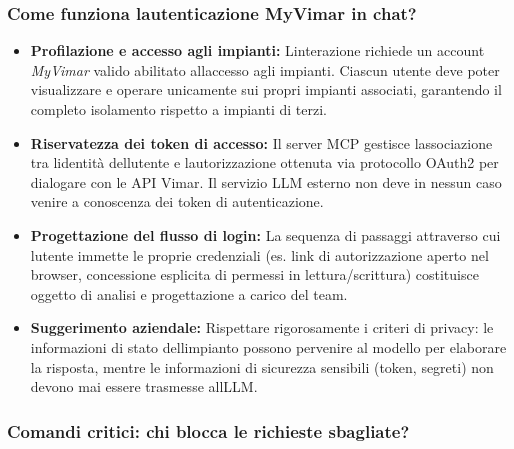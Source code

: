 \documentclass[12pt,a4paper]{article}
\newcommand{\tightlist}{\setlength{\itemsep}{1pt}\setlength{\parskip}{0pt}}
\begin{document}
\hypertarget{come-funziona-lautenticazione-myvimar-in-chat}{%
\subsubsection{\texorpdfstring{Come funziona l\textquotesingle autenticazione MyVimar in chat?}{Come funziona l'autenticazione MyVimar in chat?}}}

\begin{itemize}
\tightlist
\item \textbf{Profilazione e accesso agli impianti:} L\textquotesingle interazione richiede un account \emph{MyVimar} valido abilitato all\textquotesingle accesso agli impianti. Ciascun utente deve poter visualizzare e operare unicamente sui propri impianti associati, garantendo il completo isolamento rispetto a impianti di terzi.
\item \textbf{Riservatezza dei token di accesso:} Il server MCP gestisce l\textquotesingle associazione tra l\textquotesingle identità dell\textquotesingle utente e l\textquotesingle autorizzazione ottenuta via protocollo OAuth2 per dialogare con le API Vimar. Il servizio LLM esterno non deve in nessun caso venire a conoscenza dei token di autenticazione.
\item \textbf{Progettazione del flusso di login:} La sequenza di passaggi attraverso cui l\textquotesingle utente immette le proprie credenziali (es. link di autorizzazione aperto nel browser, concessione esplicita di permessi in lettura/scrittura) costituisce oggetto di analisi e progettazione a carico del team.
\item \textbf{Suggerimento aziendale:} Rispettare rigorosamente i criteri di privacy: le informazioni di stato dell\textquotesingle impianto possono pervenire al modello per elaborare la risposta, mentre le informazioni di sicurezza sensibili (token, segreti) non devono mai essere trasmesse all\textquotesingle LLM.
\end{itemize}

\hypertarget{comandi-critici-chi-blocca-le-richieste-sbagliate}{%
\subsubsection{\texorpdfstring{Comandi critici: chi blocca le richieste sbagliate?}{Comandi critici: chi blocca le richieste sbagliate?}}}
\end{document}
